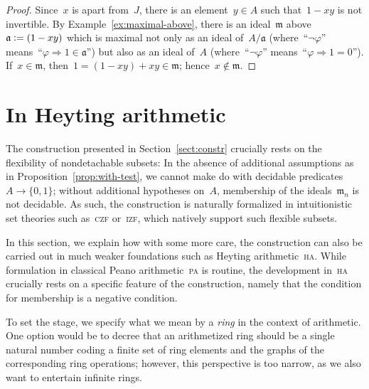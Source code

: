 \documentclass[envcountsect,envcountsame,runningheads]{llncs}
\newcommand{\aaa}{\mathfrak{a}}
\newcommand{\mmm}{\mathfrak{m}}
\newcommand{\defeq}{\vcentcolon=}
\renewcommand{\_}{\mathpunct{.}\,}
\begin{document}
\begin{proof}Since~$x$ is apart from~$J$, there is an element~$y \in A$ such that~$1-xy$
is not invertible. By Example~\ref{ex:maximal-above}, there is an ideal~$\mmm$
above~$\aaa \defeq (1-xy)$ which is maximal not only as an ideal of~$A/\aaa$
(where~``$\neg\varphi$'' means~``$\varphi \Rightarrow 1 \in \aaa$'') but also as an
ideal of~$A$ (where~``$\neg\varphi$'' means~``$\varphi \Rightarrow 1 = 0$''). If~$x
\in \mmm$, then~$1 = (1-xy) + xy \in \mmm$; hence~$x \not\in \mmm$.
\end{proof}


\section{In Heyting arithmetic}
\label{sect:arithmetization}

The construction presented in Section~\ref{sect:constr} crucially rests on the
flexibility of nondetachable subsets: In the absence of additional
assumptions as in Proposition~\ref{prop:with-test},
we cannot make do with decidable
predicates~$A \to \{0,1\}$; without additional hypotheses on~$A$, membership of the
ideals~$\mmm_n$ is not decidable. As such, the construction is
naturally formalized in intuitionistic set theories such as~\textsc{czf}
or~\textsc{izf}, which natively support such flexible subsets.

In this section, we explain how with some more care, the construction can also
be carried out in much weaker foundations such as Heyting
arithmetic~\textsc{ha}. While formulation in classical Peano arithmetic~\textsc{pa}
is routine, the development in~\textsc{ha} crucially rests on a specific
feature of the construction, namely that the condition for membership is a
negative condition.

To set the stage, we specify what we mean by a \emph{ring} in the context of
arithmetic. One option would be to decree that an arithmetized ring should be a single
natural number coding a finite set of ring elements and the graphs of the
corresponding ring operations; however, this perspective is too narrow, as we
also want to entertain infinite rings.
\end{document}
